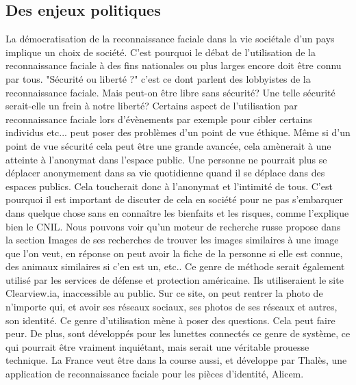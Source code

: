 \documentclass[12pt,french]{article}
\theoremstyle{plain}
\theoremstyle{definition}
\begin{document}
\subsection{Des enjeux politiques}
La démocratisation de la reconnaissance faciale dans la vie sociétale d'un pays implique un choix de société. C'est pourquoi le débat de l'utilisation de la reconnaissance faciale à des fins nationales ou plus larges encore doit être connu par tous. "Sécurité ou liberté ?" c'est ce dont parlent des lobbyistes de la reconnaissance faciale. Mais peut-on être libre sans sécurité? Une telle sécurité serait-elle un frein à notre liberté? 
Certains aspect de l'utilisation par reconnaissance faciale lors d'évènements par exemple pour cibler certains individus etc... peut poser des problèmes d'un point de vue éthique.
Même si d'un point de vue sécurité cela peut être une grande avancée, cela amènerait à une atteinte à l'anonymat dans l'espace public. Une personne ne pourrait plus se déplacer anonymement dans sa vie quotidienne quand il se déplace dans des espaces publics. Cela toucherait donc à l'anonymat et l'intimité de tous. C'est pourquoi il est important de discuter de cela en société pour ne pas s'embarquer dans quelque chose sans en connaître les bienfaits et les risques, comme l'explique bien le CNIL.
Nous pouvons voir qu'un moteur de recherche russe propose dans la section Images de ses recherches de trouver les images similaires à une image que l'on veut, en réponse on peut avoir la fiche de la personne si elle est connue, des animaux similaires si c'en est un, etc..
Ce genre de méthode serait également utilisé par les services de défense et protection américaine. Ils utiliseraient le site Clearview.ia, inaccessible au public. Sur ce site, on peut rentrer la photo de n'importe qui, et avoir ses réseaux sociaux, ses photos de ses réseaux et autres, son identité. Ce genre d'utilisation mène à poser des questions. Cela peut faire peur. De plus, sont développés pour les lunettes connectés ce genre de système, ce qui pourrait être vraiment inquiétant, mais serait une véritable prouesse technique. 
La France veut être dans la course aussi, et développe par Thalès, une application de reconnaissance faciale pour les pièces d'identité, Alicem.
\end{document}
